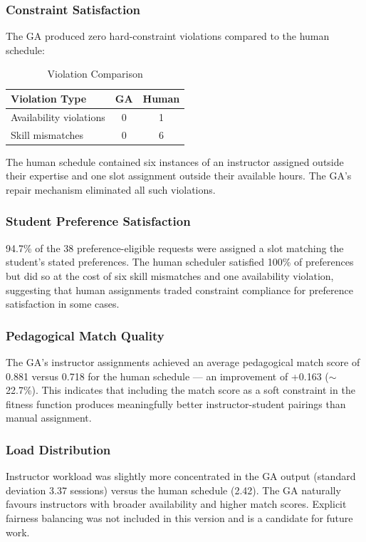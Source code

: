 \subsubsection{Constraint Satisfaction}
The GA produced zero hard-constraint violations compared to the human  schedule:
\begin{table}[h]
\centering
\caption{Violation Comparison}
\label{tab:violations}
\begin{tabular}{|l|c|c|}
\hline
\textbf{Violation Type} & \textbf{GA} & \textbf{Human} \\ \hline
Availability violations & 0 & 1 \\ \hline
Skill mismatches        & 0 & 6 \\ \hline
\end{tabular}
\end{table}

The human schedule contained six instances of an instructor assigned  outside their expertise and one slot assignment outside their available hours. The GA's repair mechanism eliminated all such violations.

\subsubsection{Student Preference Satisfaction}
94.7\% of the 38 preference-eligible requests were assigned a slot matching the student's stated preferences. The human scheduler satisfied 100\% of preferences but did so at the cost of six skill mismatches and one availability violation, suggesting that human assignments traded constraint compliance for preference satisfaction in some cases.

\subsubsection{Pedagogical Match Quality}
The GA's instructor assignments achieved an average pedagogical match  score of 0.881 versus 0.718 for the human schedule — an improvement of +0.163 ($\sim$22.7\%). This indicates that including the match score  as a soft constraint in the fitness function produces meaningfully better instructor-student pairings than manual assignment.

\subsubsection{Load Distribution}
Instructor workload was slightly more concentrated in the GA output   (standard deviation 3.37 sessions) versus the human schedule (2.42). The GA naturally favours instructors with broader availability and higher match scores. Explicit fairness balancing was not included in this version and is a candidate for future work.